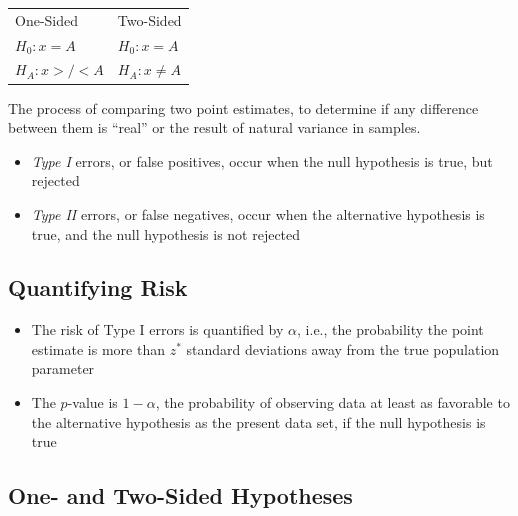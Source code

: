 
\begin{table}[]
\begin{tabular}{ll}
One-Sided      & Two-Sided       \\
$H_0: x = A$   & $H_0: x = A$    \\
$H_A: x >/< A$ & $H_A: x \neq A$
\end{tabular}
\end{table}

The process of comparing two point estimates, to determine if any difference between them is ``real'' or the result of natural variance in samples.

\begin{itemize}
	\item \textit{Type I} errors, or false positives, occur when the null hypothesis  is true, but rejected
	\item \textit{Type II} errors, or false negatives, occur when the alternative hypothesis is true, and the null hypothesis is not rejected
\end{itemize}

\subsection*{Quantifying Risk}

\begin{itemize}
	\item The risk of Type I errors is quantified by $\alpha$, i.e., the probability the point estimate is more than $z^*$ standard deviations away from the true population parameter
	\item The $p$-value is $1 - \alpha$, the probability of observing data at least as favorable to the alternative hypothesis as the present data set, if the null hypothesis is true
\end{itemize}

\subsection*{One- and Two-Sided Hypotheses}




\hformbar











